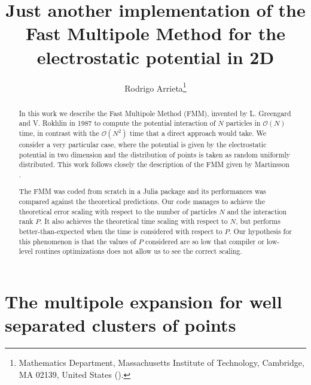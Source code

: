 \documentclass[final,onefignum,onetabnum]{siamart220329}
\title{Just another implementation of the Fast Multipole Method for the electrostatic potential in 2D}
\author{Rodrigo Arrieta\thanks{Mathematics Department, Massachusetts Institute of Technology, Cambridge, MA 02139,
		United States (\email{rarrieta@mit.edu}).}}
\newcommand{\Ocal}{\mathcal{O}}
\begin{document}
\maketitle

\begin{abstract}
	In this work we describe the Fast Multipole Method (FMM),  invented by L. Greengard and V. Rokhlin in 1987 \cite{greengard1987fast} to compute the potential interaction of $N$ particles in $\Ocal(N)$ time, in contrast with the $\Ocal(N^2)$ time that a direct approach would take. We consider a very particular case, where the potential is given by the electrostatic potential in two dimension and the distribution of points is taken as random uniformly distributed. This work follows closely the description of the FMM given by Martinsson \cite{martinsson2019fast}.
	
	The FMM was coded from scratch in a Julia package \cite{fmmproject} and its performances was compared against the theoretical predictions. Our code manages to achieve the theoretical error scaling with respect to the number of particles $N$ and the interaction rank $P$. It also achieves the theoretical time scaling with respect to $N$, but performs better-than-expected when the time is considered with respect to $P$. Our hypothesis for this phenomenon is that the values of $P$ considered are so low that compiler or low-level routines optimizations does not allow us to see the correct scaling.
\end{abstract}


\section{The multipole expansion for well separated clusters of points}\label{sec:multipole}
\end{document}
